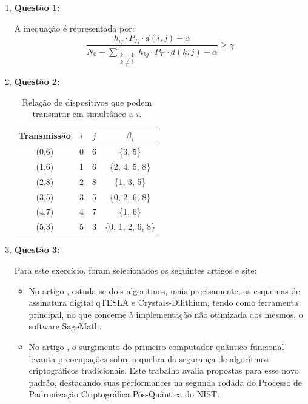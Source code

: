 \documentclass{article}
\begin{document}
	
	\begin{enumerate}
		\item \textbf{Questão 1:}
		
		A inequação é representada por:
		\begin{equation}
			\frac{h_{ij} \cdot P_{T_i} \cdot d(i, j) - \alpha}{N_0 + \sum_{\substack{k=1 \\ k \neq i}}^{\tau} h_{kj} \cdot P_{T_i} \cdot d(k, j) - \alpha} \geq \gamma
		\end{equation}
		
		\item \textbf{Questão 2:}
		
		\begin{table}[htbp]
			\centering
			\caption{Relação de dispositivos que podem transmitir em simultâneo a $i$.}
			\begin{tabular}{cccc}
				\toprule
				Transmissão & $i$ & $j$ & $\beta_i$ \\
				\midrule
				(0,6) & 0 & 6 & \{3, 5\} \\ \hline
				(1,6) & 1 & 6 & \{2, 4, 5, 8\} \\ \hline
				(2,8) & 2 & 8 & \{1, 3, 5\} \\ \hline
				(3,5) & 3 & 5 & \{0, 2, 6, 8\} \\ \hline
				(4,7) & 4 & 7 & \{1, 6\} \\ \hline
				(5,3) & 5 & 3 & \{0, 1, 2, 6, 8\} \\
				\bottomrule
			\end{tabular}
		\end{table}
		
		\item \textbf{Questão 3:}
		
		Para este exercício, foram selecionados os seguintes artigos e site:
		\begin{itemize}
			\item No artigo \cite{de2020esquemas}, estuda-se dois algoritmos, mais precisamente, os esquemas de assinatura digital qTESLA e Crystals-Dilithium, tendo como ferramenta principal, no que concerne à implementação não otimizada dos mesmos, o software SageMath.
			\item No artigo \cite{amorim2020comparaccao}, o surgimento do primeiro computador quântico funcional levanta preocupações sobre a quebra da segurança de algoritmos criptográficos tradicionais. Este trabalho avalia propostas para esse novo padrão, destacando suas performances na segunda rodada do Processo de Padronização Criptográfica Pós-Quântica do NIST.
			

\end{itemize}
\end{enumerate}
\end{document}

